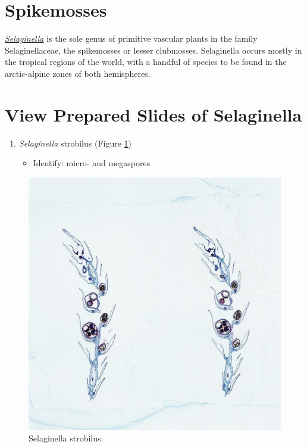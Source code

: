 \section{Spikemosses}\label{spikemosses}

\href{https://en.wikipedia.org/wiki/Selaginella}{\emph{Selaginella}} is
the sole genus of primitive vascular plants in the family
Selaginellaceae, the spikemosses or lesser clubmosses. Selaginella
occurs mostly in the tropical regions of the world, with a handful of
species to be found in the arctic-alpine zones of both hemispheres.

\section{View Prepared Slides of
Selaginella}\label{view-prepared-slides-of-selaginella}

\begin{enumerate}
\def\labelenumi{\arabic{enumi}.}
\tightlist
\item
  \emph{Selaginella} strobilus (Figure \ref{fig:selaginstrobilus})

  \begin{itemize}
  \tightlist
  \item
    Identify: micro- and megaspores
  \end{itemize}
\end{enumerate}

\begin{figure}

{\centering \includegraphics[width=0.7\linewidth]{./figures/mosses/selaginella_strobilus}

}

\caption{Selaginella strobilus.}\label{fig:selaginstrobilus}
\end{figure}

